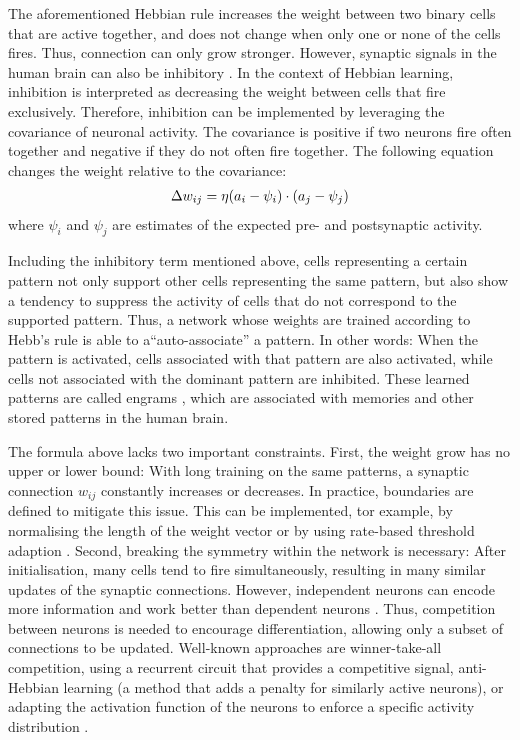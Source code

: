 The aforementioned Hebbian rule increases the weight between two binary cells that are active together, and does not change when only one or none of the cells fires. Thus, connection can only grow stronger.
However, synaptic signals in the human brain can also be inhibitory \cite{coombs_specific_1955}.
In the context of Hebbian learning, inhibition is interpreted as decreasing the weight between cells that fire exclusively.
Therefore, inhibition can be implemented by leveraging the covariance of neuronal activity.
The covariance is positive if two neurons fire often together and negative if they do not often fire together.
The following equation changes the weight relative to the covariance:
%
\begin{align}\eqlbl{hebb_2}
	\Delta w_{ij} = \eta (a_i - \psi_i) \cdot (a_j - \psi_j)
\end{align}
%
where \(\psi_i\) and \(\psi_j\) are estimates of the expected pre- and postsynaptic activity.

Including the inhibitory term mentioned above, cells representing a certain pattern not only support other cells representing the same pattern, but also show a tendency to suppress the activity of cells that do not correspond to the supported pattern. Thus, a network whose weights are trained according to Hebb's rule is able to a``auto-associate'' a pattern. In other words: When the pattern is activated, cells associated with that pattern are also activated, while cells not associated with the dominant pattern are inhibited. These learned patterns are called engrams , which are associated with memories and other stored patterns in the human brain.

The formula above lacks two important constraints.
First, the weight grow has no upper or lower bound: With long training on the same patterns, a synaptic connection $w_{ij}$ constantly increases or decreases. In practice, boundaries are defined to mitigate this issue. This can be implemented, tor example,  by normalising the length of the weight vector  or by using rate-based threshold adaption .
Second, breaking the symmetry within the network is necessary: After initialisation, many cells tend to fire simultaneously, resulting in many similar updates of the synaptic connections. However, independent neurons can encode more information and work better than dependent neurons .
Thus, competition between neurons is needed to encourage differentiation, allowing only a subset of connections to be updated.
Well-known approaches are winner-take-all competition, using a recurrent circuit that provides a competitive signal, anti-Hebbian learning  (a method that adds a penalty for similarly active neurons), or adapting the activation function of the neurons to enforce a specific activity distribution .



